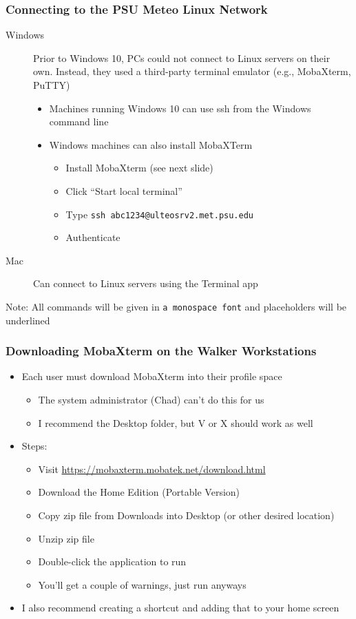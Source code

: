 \documentclass[hyperref,pdfa,unicode,utf8,usepdftitle]{beamer}
\begin{document}
\begin{frame}
  \frametitle{Connecting to the PSU Meteo Linux Network}
  \begin{description}
  \item[Windows] Prior to Windows 10, PCs could not connect to Linux
    servers on their own. Instead, they used a third-party terminal
    emulator (e.g., MobaXterm, PuTTY)
    \begin{itemize}
    \item Machines running Windows 10 can use ssh from the Windows
      command line
    \item Windows machines can also install MobaXTerm
      \begin{itemize}
      \item Install MobaXterm (see next slide)
      \item Click “Start local terminal”
      \item Type
        \lstinline{ssh abc1234@ulteosrv2.met.psu.edu}
      \item Authenticate
      \end{itemize}
    \end{itemize}
  \item[Mac] Can connect to Linux servers using the Terminal app
  \end{description}
  Note: All commands will be given in \lstinline{a monospace font} and
  placeholders will be underlined
\end{frame}

\begin{frame}
  \frametitle{Downloading MobaXterm on the Walker Workstations}
  \begin{itemize}
  \item Each user must download MobaXterm into their profile space
    \begin{itemize}
    \item The system administrator (Chad) can’t do this for us
    \item I recommend the Desktop folder, but V or X should work as
      well
    \end{itemize}
  \item Steps:
    \begin{itemize}
    \item Visit \url{https://mobaxterm.mobatek.net/download.html}
    \item Download the Home Edition (Portable Version)
    \item Copy zip file from Downloads into Desktop (or other desired
      location)
    \item Unzip zip file
    \item Double-click the application to run
    \item You’ll get a couple of warnings, just run anyways
    \end{itemize}
  \item I also recommend creating a shortcut and adding that to your
    home screen
  \end{itemize}
\end{frame}
\end{document}
